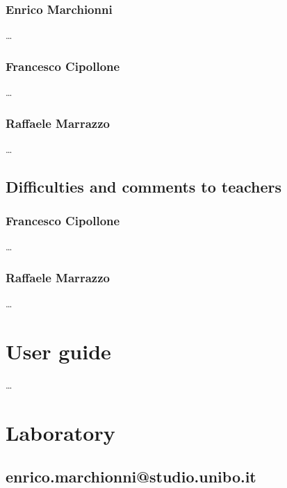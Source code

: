 \documentclass[12pt, a4paper]{report}
\begin{document}
    \subsection*{Enrico Marchionni}
    
    \dots

    \subsection*{Francesco Cipollone}

    \dots

    \subsection*{Raffaele Marrazzo}

    \dots

\section{Difficulties and comments to teachers}

    \subsection*{Francesco Cipollone}

    \dots

    \subsection*{Raffaele Marrazzo}

    \dots

\appendix

\chapter{User guide}

    \dots

\chapter{Laboratory}

\section{enrico.marchionni@studio.unibo.it}
\end{document}

